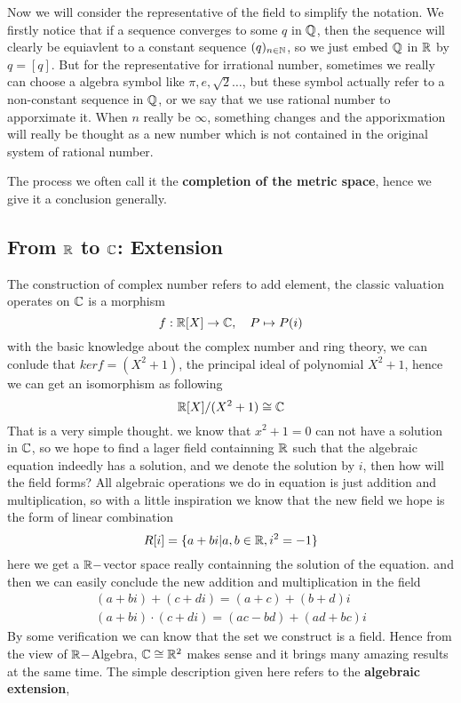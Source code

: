 \documentclass[en,geye,blue,normal,12pt]{elegantnote}
\begin{document}
Now we will consider the representative of the field to simplify the notation. We firstly notice that if a sequence converges to some \(q\) in \(\mathbb{Q} \), then the sequence will clearly be equiavlent to a constant sequence \((q)_{n \in \mathbb{N}}\), so we just embed \(\mathbb{Q}\) in \(\mathbb{R}\) by \(q = [q]\). But for the representative for irrational number, sometimes we really can choose a algebra symbol like \(\pi, e, \sqrt{2}\dots\), but these symbol actually refer to a non-constant sequence in \(\mathbb{Q}\), or we say that we use rational number to apporximate it. When \(n\) really be \(\infty\), something changes and the apporixmation will really be  thought as a new number which is not contained in the original system of rational number.

The process we often call it the \textbf{completion of the metric space}, hence we give it a conclusion generally.


\subsection{From \texorpdfstring{$\mathbb{R}$}{TEXT} to \texorpdfstring{$\mathbb{C}$}{TEXT}: Extension}

The construction of complex number refers to add element, the classic valuation operates on \(\mathbb{C}\) is a morphism\[f: \mathbb{R}[X] \to \mathbb{C}, \quad P \mapsto P(i)\]
with the basic knowledge about the complex number and ring theory, we can conlude that \(kerf = (X^2+1)\), the principal ideal of polynomial \(X^2+1\), hence we can get an isomorphism as following
\[\mathbb{R}[X] / (X^2+1) \cong  \mathbb{C} \]
That is a very simple thought. we know that \(x^2+1 = 0\) can not have a solution in \(\mathbb{C}\), so we hope to find a lager field containning \(\mathbb{R}\) such that the algebraic equation indeedly has a solution, and we denote the solution by \(i\), then how will the field forms? All algebraic operations we do in equation is just addition and multiplication, so with a little inspiration we know that the new field we hope is the form of linear combination
\[R[i] = \{a+bi | a,b \in \mathbb{R}, i^2 = -1\}\]
here we get a \(\mathbb{R}-\)vector space really containning the solution of the equation. and then we can easily conclude the new addition and multiplication in the field
\begin{align*}
  (a+bi) + (c+di) = (a+c)+(b+d)i \\
  (a+bi) \cdot (c+di) =  (ac-bd)+(ad+bc)i
\end{align*}
By some verification we can know that the set we construct is a field. Hence from the view of \(\mathbb{R}-\)Algebra, \(\mathbb{C} \cong \mathbb{R}^2\) makes sense and it brings many amazing results at the same time. The simple description given here refers to the \textbf{algebraic extension},
\end{document}

